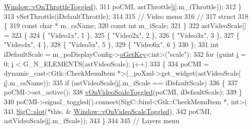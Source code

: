 \begin{DoxyCode}
{{      \mbox{\hyperlink{class_v_b_a_1_1_window_a86f6a68bfbf9928605aa80a543d49038}{Window::vOnThrottleToggled}}),
311                                       poCMI, astThrottle[\mbox{\hyperlink{expr-lex_8cpp_acb559820d9ca11295b4500f179ef6392}{i}}].m\_iThrottle));
312   \}
313   vSetThrottle(iDefaultThrottle);
314 
315   \textcolor{comment}{// Video menu}
316   \textcolor{comment}{//}
317   \textcolor{keyword}{struct}
318   \{
319     \textcolor{keyword}{const} \textcolor{keywordtype}{char} * m\_csName;
320     \textcolor{keyword}{const} \textcolor{keywordtype}{int}    m\_iScale;
321   \}
322   astVideoScale[] =
323   \{
324     \{ \textcolor{stringliteral}{"Video1x"}, 1 \},
325     \{ \textcolor{stringliteral}{"Video2x"}, 2 \},
326     \{ \textcolor{stringliteral}{"Video3x"}, 3 \},
327     \{ \textcolor{stringliteral}{"Video4x"}, 4 \},
328     \{ \textcolor{stringliteral}{"Video5x"}, 5 \},
329     \{ \textcolor{stringliteral}{"Video6x"}, 6 \}
330   \};
331   \textcolor{keywordtype}{int} iDefaultScale = m\_poDisplayConfig->\mbox{\hyperlink{class_v_b_a_1_1_config_1_1_section_ab169d7aae4e9dde91418ba1668e3ad39}{oGetKey}}<\textcolor{keywordtype}{int}>(\textcolor{stringliteral}{"scale"});
332   \textcolor{keywordflow}{for} (guint \mbox{\hyperlink{expr-lex_8cpp_acb559820d9ca11295b4500f179ef6392}{i}} = 0; \mbox{\hyperlink{expr-lex_8cpp_acb559820d9ca11295b4500f179ef6392}{i}} < G\_N\_ELEMENTS(astVideoScale); \mbox{\hyperlink{expr-lex_8cpp_acb559820d9ca11295b4500f179ef6392}{i}}++)
333   \{
334     poCMI = \textcolor{keyword}{dynamic\_cast<}Gtk::CheckMenuItem *\textcolor{keyword}{>}(\_poXml->get\_widget(astVideoScale[
      \mbox{\hyperlink{expr-lex_8cpp_acb559820d9ca11295b4500f179ef6392}{i}}].m\_csName));
335     \textcolor{keywordflow}{if} (astVideoScale[\mbox{\hyperlink{expr-lex_8cpp_acb559820d9ca11295b4500f179ef6392}{i}}].m\_iScale == iDefaultScale)
336     \{
337       poCMI->set\_active();
338       \mbox{\hyperlink{class_v_b_a_1_1_window_af0072d4a223c1a543dd5ce0933a72804}{vOnVideoScaleToggled}}(poCMI, iDefaultScale);
339     \}
340     poCMI->signal\_toggled().connect(SigC::bind<Gtk::CheckMenuItem *, int>(
341                                       \mbox{\hyperlink{namespace_sig_c_a92e4f19202b77e78ac1db05f5a62f6b6}{SigC::slot}}(*\textcolor{keyword}{this}, &
      \mbox{\hyperlink{class_v_b_a_1_1_window_af0072d4a223c1a543dd5ce0933a72804}{Window::vOnVideoScaleToggled}}),
342                                       poCMI, astVideoScale[\mbox{\hyperlink{expr-lex_8cpp_acb559820d9ca11295b4500f179ef6392}{i}}].m\_iScale));
343   \}
344 
345   \textcolor{comment}{// Layers menu}
}}
\end{DoxyCode}

